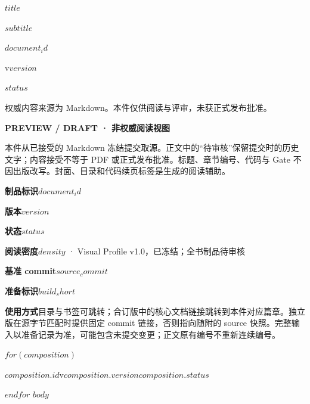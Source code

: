 \documentclass[UTF8,fontset=none,scheme=plain,11pt,a4paper,oneside,openany]{kbbook}
\begin{document}
\pagestyle{empty}
\pagecolor{PreviewNavy}\color{white}
\vspace*{30mm}
\begin{flushleft}{\sffamily\bfseries\fontsize{29}{38}\selectfont $title$\par}\end{flushleft}
\vspace{8mm}
{\sffamily\large $subtitle$\par}
\vfill
{\sffamily\small $document_id$\par\medskip v$version$\par\medskip $status$\par}
\vspace{10mm}
{\small 权威内容来源为 Markdown。本件仅供阅读与评审，未获正式发布批准。\par}
\clearpage\nopagecolor\color{PreviewInk}\pagestyle{fancy}
\noindent\textbf{PREVIEW / DRAFT · 非权威阅读视图}

本件从已接受的 Markdown 冻结提交取源。正文中的“待审核”保留提交时的历史文字；内容接受不等于 PDF 或正式发布批准。标题、章节编号、代码与 Gate 不因出版改写。封面、目录和代码续页标签是生成的阅读辅助。

\medskip
\noindent\textbf{制品标识}\quad $document_id$\par
\noindent\textbf{版本}\quad $version$\par
\noindent\textbf{状态}\quad $status$\par
\noindent\textbf{阅读密度}\quad $density$ · Visual Profile v1.0，已冻结；全书制品待审核\par
\noindent\textbf{基准 commit}\quad\texttt{$source_commit$}\par
\noindent\textbf{准备标识}\quad\texttt{$build_short$}\par
\noindent\textbf{使用方式}\quad 目录与书签可跳转；合订版中的核心文档链接跳转到本件对应篇章。独立版在源字节匹配时提供固定 commit 链接，否则指向随附的 source 快照。完整输入以准备记录为准，可能包含未提交变更；正文原有编号不重新连续编号。

$for(composition)$
\par\noindent\hyperlink{$composition.anchor$}{\textbf{$composition.id$}}\quad v$composition.version$\quad $composition.status$\par
$endfor$
\clearpage
\setcounter{tocdepth}{$toc_depth$}
\tableofcontents
\clearpage
$body$
\end{document}
